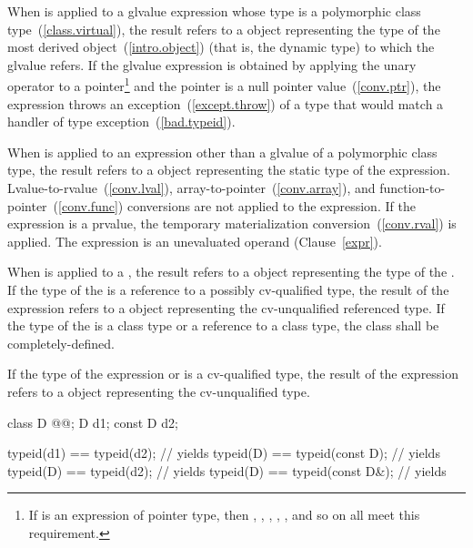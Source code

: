 \pnum
When  is applied to a glvalue expression whose type is a
polymorphic class type~(\ref{class.virtual}), the result refers to a
 object representing the type of the most derived
object~(\ref{intro.object}) (that is, the dynamic type) to which the
glvalue refers. If the glvalue expression is obtained by applying the
unary \tcode{*} operator to a pointer\footnote{If  is an expression of
pointer type, then ,
, , , , and so on
all meet this requirement.}
and the pointer is a null pointer value~(\ref{conv.ptr}), the
 expression throws an exception~(\ref{except.throw}) of
a type that would match a handler of type
%
%
exception~(\ref{bad.typeid}).

\pnum
When  is applied to an expression other than a glvalue of
a polymorphic class type, the result refers to a 
object representing the static type of the expression.
Lvalue-to-rvalue~(\ref{conv.lval}), array-to-pointer~(\ref{conv.array}),
and function-to-pointer~(\ref{conv.func}) conversions are not applied to
the expression.
If the expression is a prvalue,
the temporary materialization conversion~(\ref{conv.rval})
is applied.
The expression is an unevaluated operand (Clause~\ref{expr}).

\pnum
When  is applied to a , the result
refers to a  object representing the type of the
. If the type of the  is a reference
to a possibly cv-qualified type, the result of the
 expression refers to a  object
representing the cv-unqualified referenced type. If the type of
the  is a class type or a reference to a class type,
the class shall be completely-defined.

\pnum
If the type of the expression or  is a
cv-qualified type, the result of the  expression refers
to a  object representing the cv-unqualified
type.
\begin{example}

\begin{codeblock}
class D @@;
D d1;
const D d2;

typeid(d1) == typeid(d2);       // yields 
typeid(D)  == typeid(const D);  // yields 
typeid(D)  == typeid(d2);       // yields 
typeid(D)  == typeid(const D&); // yields 
\end{codeblock}
\end{example}

